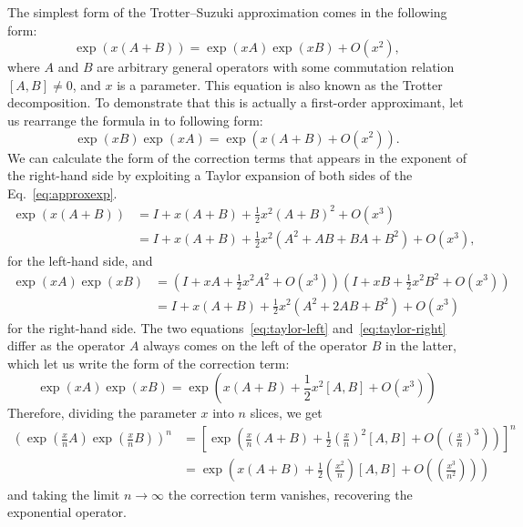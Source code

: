The simplest form of the Trotter--Suzuki approximation comes in the following form:
\begin{equation} \label{eq:approxexp}
\exp\left({x(A+B)}\right) = \exp\left({xA}\right)\exp\left({xB}\right) + O(x^2), 
\end{equation}
where $A$ and $B$ are arbitrary general operators with some commutation relation $[A,B] \neq 0$, and $x$ is a parameter. This equation is also known as the Trotter decomposition. To demonstrate that this is actually a first-order approximant, let us rearrange the formula in to following form:
\begin{equation}
\exp\left({xB}\right)\exp\left({xA}\right) = \exp\left({x(A+B) + O(x^2)}\right).
\end{equation}
We can calculate the form of the correction terms that appears in the exponent of the right-hand side by exploiting a Taylor expansion of both sides of the Eq.~\eqref{eq:approxexp}.
\begin{align}  \label{eq:taylor-left}
\exp\left({x(A+B)}\right) &= I + x(A+B) + \frac{1}{2} x^2 (A+B)^2 + O(x^3) \\
& = I + x(A+B) + \frac{1}{2} x^2 (A^2 + AB + BA + B^2) + O(x^3) , \nonumber
\end{align}
for the left-hand side, and
\begin{align} \label{eq:taylor-right}
\exp\left({xA}\right) \exp\left( {xB}\right) &= (I + xA + \frac{1}{2} x^2 A^2 + O(x^3)) (I + xB + \frac{1}{2} x^2 B^2 + O(x^3)) \nonumber \\
& = I + x(A+B) + \frac{1}{2} x^2 (A^2 + 2AB + B^2) + O(x^3) 
\end{align}
for the right-hand side. The two equations~\eqref{eq:taylor-left} and~\eqref{eq:taylor-right} differ as the operator $A$ always comes on the left of the operator $B$ in the latter, which let us write the form of the correction term:
\begin{equation}
\exp\left({xA}\right) \exp\left({xB}\right) = \exp\left({x(A+B) + \frac{1}{2} x^2 [A,B] + O(x^3)}\right)
\end{equation}
Therefore, dividing the parameter $x$ into $n$ slices, we get
\begin{align}
\left(\exp\left({\frac{x}{n}A}\right) \exp\left({\frac{x}{n}B}\right) \right)^n &= \left[ \exp\left({\frac{x}{n}(A + B) + \frac{1}{2}\left(\frac{x}{n}\right)^2 [A,B] + O\left(\left(\frac{x}{n}\right)^3\right)}\right) \right]^n \nonumber \\ 
&= \exp\left({x(A+B) + \frac{1}{2}\left(\frac{x^2}{n}\right) [A,B] + O\left(\left(\frac{x^3}{n^2}\right)\right)}\right) \nonumber
\end{align}
and taking the limit $n \rightarrow \infty$ the correction term vanishes, recovering the exponential operator.

